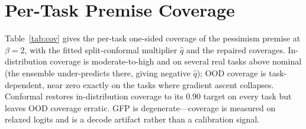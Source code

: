 \documentclass[letterpaper]{article}
\theoremstyle{plain}
\begin{document}
\section{Per-Task Premise Coverage}
Table~\ref{tab:cov} gives the per-task one-sided coverage of the pessimism premise at $\beta{=}2$, with the fitted split-conformal multiplier $\hat q$ and the repaired coverages. In-distribution coverage is moderate-to-high and on several real tasks above nominal (the ensemble under-predicts there, giving negative $\hat q$); OOD coverage is task-dependent, near zero exactly on the tasks where gradient ascent collapses. Conformal restores in-distribution coverage to its $0.90$ target on every task but leaves OOD coverage erratic. GFP is degenerate---coverage is measured on relaxed logits and is a decode artifact rather than a calibration signal.
\end{document}
